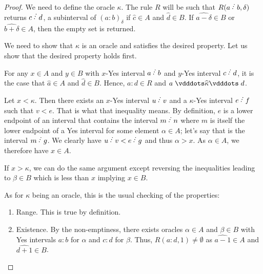 \documentclass[12pt]{article}
\begin{document}
\begin{proof}
    We need to define the oracle $\kappa$. The rule $R$ will be such that $R(a\lte b, \delta)$ returns $c\lte d$, a subinterval of $(a:b)_\delta$ if $\widehat{c} \in A$ and $\widehat{d} \in B$. If $\widehat{a-\delta} \in B$ or $\widehat{b+\delta} \in A$, then the empty set is returned. 

    We need to show that $\kappa$ is an oracle and satisfies the desired property. Let us show that the desired property holds first. 


    For any $x \in A$ and $y \in B$ with $x$-Yes interval $a \lte b$  and $y$-Yes interval $c \lte d$, it is the case that $\widehat{a} \in A$ and $\widehat{d} \in B$. Hence, $a:d \in R$ and $a \xora[\kappa] d$. 

    Let $ x < \kappa$. Then there exists an $x$-Yes interval $u\lte v$ and a $\kappa$-Yes interval $e\lte f$ such that $v < e$. That is what that inequality means. By definition, $e$ is a lower endpoint of an interval that contains the interval $m\lte n$ where $m$ is itself the lower endpoint of a Yes interval for some element $\alpha \in A$; let's say that is the interval $m\lte g$. We clearly have $ u \lte v < e \lte g$ and thus $\alpha > x$. As $\alpha \in A$, we therefore have $x \in A$. 

    If $x > \kappa$, we can do the same argument except reversing the inequalities leading to $\beta \in B$ which is less than $x$ implying $x \in B$.

    As for $\kappa$ being an oracle, this is the usual checking of the properties: 
    \begin{enumerate}
        \item Range. This is true by definition. 
        
        \item Existence. By the non-emptiness, there exists oracles $\alpha \in A$ and $\beta \in B$ with Yes intervals $a:b$ for $\alpha$ and $c:d$ for $\beta$. Thus, $R(a:d, 1) \neq \emptyset$ as $\widehat{a-1} \in A$ and $\widehat{d+1} \in B$. 
        

\end{enumerate}
\end{proof}
\end{document}
